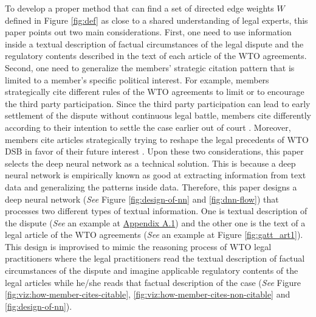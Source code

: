 To develop a proper method that can find a set of directed edge weights $W$ defined in Figure \ref{fig:def}
as close to a shared understanding of legal experts, this paper points out two main considerations.
First, one need to use information inside a textual description of factual circumstances of the legal dispute and the regulatory contents described in the text of each article of the WTO agreements.
Second, one need to generalize the members' strategic citation pattern that is limited to a member's specific political interest.
For example, members strategically cite different rules of the WTO agreements to limit or to encourage
the third party participation. Since the third party participation
can lead to early settlement of the dispute without continuous
legal battle, members cite differently according to their intention to
settle the case earlier out of court \citep{who_gets}. Moreover, members cite articles strategically trying to reshape the legal precedents of WTO DSB
in favor of their future interest \citep{pelc, latent}.
Upon these two considerations, this paper selects the deep neural network as a technical solution. %
This is because a deep neural network is empirically known as good at extracting information from text data and generalizing the patterns inside data.
Therefore, this paper designs a deep neural network (\textit{See} Figure \ref{fig:design-of-nn} and \ref{fig:dnn-flow}) that
processes two different types of textual information.
One is textual description of the dispute (\textit{See} an example at \hyperref[sub:factual-aspect-example]{Appendix A.1}) and
the other one is the text of a legal article of the WTO agreements (\textit{See} an example at Figure \ref{fig:gatt_art1}).
This design is improvised to mimic
the reasoning process of WTO legal practitioners
where the legal practitioners read
the textual description of
factual circumstances of the dispute and imagine applicable regulatory contents of
the legal articles while he/she reads that factual description of the case (\textit{See} Figure \ref{fig:viz:how-member-cites-citable}, \ref{fig:viz:how-member-cites-non-citable} and \ref{fig:design-of-nn}).
